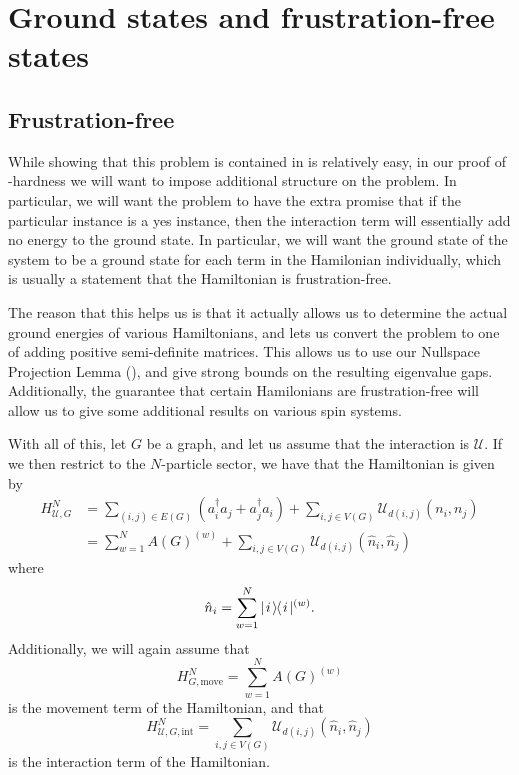\documentclass[../thesis-main/thesis-main]{subfiles}
\begin{document}
\section{Ground states and frustration-free states}
\subsection{Frustration-free}


While showing that this problem is contained in \QMA is relatively easy, in our proof of \QMA-hardness we will want to impose additional structure on the problem.  In particular, we will want the problem to have the extra promise that if the particular instance is a yes instance, then the interaction term will essentially add no energy to the ground state.  In particular, we will want the ground state of the system to be a ground state for each term in the Hamilonian individually, which is usually a statement that the Hamiltonian is frustration-free.

The reason that this helps us is that it actually allows us to determine the actual ground energies of various Hamiltonians, and lets us convert the problem to one of adding positive semi-definite matrices.  This allows us to use our Nullspace Projection Lemma (), and give strong bounds on the resulting eigenvalue gaps.  Additionally, the guarantee that certain Hamilonians are frustration-free will allow us to give some additional results on various spin systems.




With all of this, let $G$ be a graph, and let us assume that the interaction is $\mathcal{U}$.  If we then restrict to the $N$-particle sector, we have that the Hamiltonian is given by
\begin{align}
  H_{\mathcal{U},G}^N &= \sum_{(i,j) \in E(G)} (a_i^\dag a_j + a_j^\dag a_i) + \sum_{i,j\in V(G)} \mathcal{U}_{d(i,j)}(n_i,n_j)\\
    &= \sum_{w=1}^N A(G)^{(w)} + \sum_{i,j\in V(G)} \mathcal{U}_{d(i,j)} (\hat{n}_i,\hat{n}_j)\label{eq:MPQW_Hamiltonian}
\end{align}
where
\begin{equation}
  \hat{n}_i = \sum_{w=1}^N |\mspace{2mu} i \mspace{2mu} \rangle\mspace{-2mu}\langle\mspace{2mu} i \mspace{2mu} |^{(w)}.
\end{equation}
Additionally, we will again assume that 
\begin{equation}
  H_{G,\text{move}}^N = \sum_{w=1}^N A(G)^{(w)}
  \label{eq:MPQW_Hamiltonian_move}
\end{equation}
is the movement term of the Hamiltonian, and that
\begin{equation}
  H_{\mathcal{U},G,\text{int}}^{N} =  \sum_{i,j\in V(G)} \mathcal{U}_{d(i,j)} (\hat{n}_i,\hat{n}_j)
  \label{eq:MPQW_Hamiltonian_int}
\end{equation}
is the interaction term of the Hamiltonian.
\end{document}
